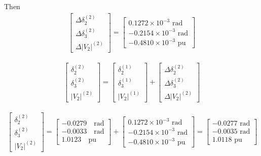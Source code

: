 \documentclass[11pt, oneside, reqno]{amsart}
\numberwithin{equation}{section}
\theoremstyle{plain}%
\theoremstyle{definition}
\theoremstyle{remark}
\begin{document}
Then 
\begin{align*}
	\begin{bmatrix}
		\Delta \delta^{(2)}_2\\
		\Delta \delta^{(2)}_3\\
		\Delta |V_2|^{(2)}
	\end{bmatrix}
= 	
\begin{bmatrix}
	0.1272\times 10^{-3} \text{ rad}\\
	-0.2154\times 10^{-3} \text{ rad}\\
	-0.4810\times 10^{-3} \text{ pu}
\end{bmatrix}
\end{align*}


\begin{align*}
	\begin{bmatrix}
		 \delta^{(2)}_2\\
		 \delta^{(2)}_3\\
		  |V_2|^{(2)}
	\end{bmatrix}
= 	\begin{bmatrix}
		 \delta^{(1)}_2\\
		 \delta^{(1)}_3\\
		  |V_2|^{(1)}
	\end{bmatrix}
+
	\begin{bmatrix}
		\Delta \delta^{(2)}_2\\
		\Delta \delta^{(2)}_3\\
		\Delta |V_2|^{(2)}
	\end{bmatrix}
\end{align*}


\begin{align*}
	\begin{bmatrix}
		 \delta^{(2)}_2\\
		 \delta^{(2)}_3\\
		  |V_2|^{(2)}
	\end{bmatrix}
= 	\begin{bmatrix}
		 -0.0279\quad\text{rad}\\
		 -0.0033\quad\text{rad}\\
		  1.0123\quad\text{pu}
	\end{bmatrix}
+
	\begin{bmatrix}
		 0.1272\times 10^{-3} \text{ rad}\\
	-0.2154\times 10^{-3} \text{ rad}\\
	-0.4810\times 10^{-3} \text{ pu}
	\end{bmatrix}
	= 
\begin{bmatrix}
	-0.0277 \text{ rad}\\
	-0.0035 \text{ rad}\\
	1.0118\text{ pu}
\end{bmatrix}
\end{align*}
\end{document}
